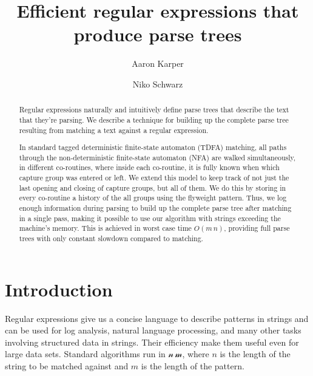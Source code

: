 \documentclass[11pt]{Thesis}
\author{Aaron Karper \and Niko Schwarz}
\theoremstyle{definition}
\begin{document}
\setlength{\pdfpageheight}{\paperheight}
\setlength{\pdfpagewidth}{\paperwidth}

\newcommand{\abs}[1]{\left|#1\right|}

\frenchspacing

\title{Efficient regular expressions that produce parse trees}

\maketitle

\begin{abstract}
Regular expressions naturally and intuitively define parse trees that describe
the text that they're parsing.  We describe a technique for building up the
complete parse tree resulting from matching a text against a regular
expression.

In standard tagged deterministic finite-state automaton (TDFA) matching, all
paths through the non-deterministic finite-state automaton (NFA) are walked
simultaneously, in different co-routines, where inside each co-routine, it is
fully known when which capture group was entered or left. We extend this model
to keep track of not just the last opening and closing of capture groups, but
all of them. We do this by storing in every co-routine a history of the all
groups using the flyweight pattern. Thus, we log enough information during
parsing to build up the complete parse tree after matching in a single pass, 
making it possible to use our algorithm with strings exceeding the machine's
memory. This is achieved in  worst case time $O(m\,n)$, providing full parse 
trees with only constant slowdown compared to matching.
\end{abstract}

\tableofcontents

\chapter{Introduction}

Regular expressions give us a concise language to describe patterns in 
strings and can be used for log analysis, natural language processing, and 
many other tasks involving structured data in strings. Their efficiency make 
them useful even for large data sets. Standard algorithms run in 
$\mathcal{n\, m}$, where $n$ is the length of the string to be matched 
against and $m$ is the length of the pattern\cite{Sedg90a}.
\end{document}

